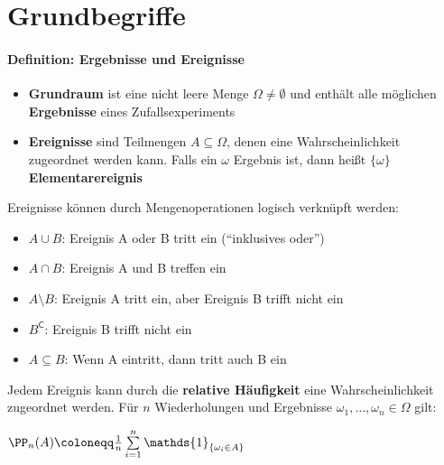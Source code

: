 \section{Grundbegriffe}
\paragraph{Definition: Ergebnisse und Ereignisse}
\begin{itemize}
	\item \textbf{Grundraum} ist eine nicht leere Menge $\Omega\neq\emptyset$ und enthält alle möglichen \textbf{Ergebnisse} eines Zufallsexperiments
	\item \textbf{Ereignisse} sind Teilmengen $A\subseteq\Omega$, denen eine Wahrscheinlichkeit zugeordnet werden kann. 
	Falls ein $\omega$ Ergebnis ist, dann heißt $\{\omega\}$ \textbf{Elementarereignis}
\end{itemize}
Ereignisse können durch Mengenoperationen logisch verknüpft werden:
\begin{itemize}
	\item $A\cup B$: Ereignis A oder B tritt ein (\enquote{inklusives oder})
	\item $A\cap B$: Ereignis A und B treffen ein
	\item $A\setminus B$: Ereignis A tritt ein, aber Ereignis B trifft nicht ein
	\item $B^{\mathsf{C}}$: Ereignis B trifft nicht ein
	\item $A\subseteq B$: Wenn A eintritt, dann tritt auch B ein
\end{itemize}
Jedem Ereignis kann durch die \textbf{relative Häufigkeit} eine Wahrscheinlichkeit zugeordnet werden. 
Für $n$ Wiederholungen und Ergebnisse $\omega_1,\ldots,\omega_n\in\Omega$ gilt:\\
\begin{tightcenter}
	$\PP_n(A)\coloneqq\frac{1}{n}\sum\limits_{i=1}^{n} \mathds{1}_{\{\omega_i \in A\}}$
\end{tightcenter}


